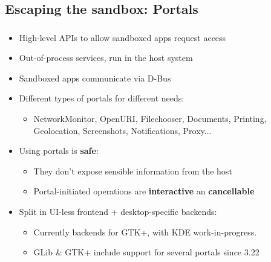 \subsection{Escaping the sandbox: Portals}
\begin{frame}
  \frametitle{\insertsubsection}

  \begin{itemize}
  \item High-level APIs to allow sandboxed apps request access\vspacing
  \item Out-of-process services, run in the host system\vspacing
  \item Sandboxed apps communicate via D-Bus\vspacing
  \item Different types of portals for different needs:
    \begin{itemize}
    \item NetworkMonitor, OpenURI, Filechooser, Documents, Printing, Geolocation, Screenshots, Notifications, Proxy...\vspacing
    \end{itemize}

  \item Using portals is \textbf{safe}:
    \begin{itemize}
    \item They don't expose sensible information from the host\vspacing
    \item Portal-initiated operations are \textbf{interactive} an \textbf{cancellable}\vspacing
    \end{itemize}

  \item Split in UI-less frontend + desktop-specific backends:
    \begin{itemize}
    \item Currently backends for GTK+, with KDE work-in-progress.\vspacing
    \item GLib \& GTK+ include support for several portals since 3.22
    \end{itemize}
  \end{itemize}

\end{frame}


